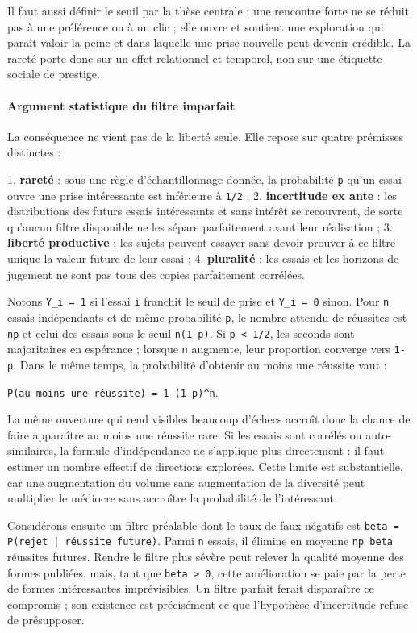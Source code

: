 \documentclass[10pt,a4paper]{article}
\begin{document}
Il faut aussi définir le seuil par la thèse centrale : une rencontre forte ne se réduit pas à une préférence ou à un clic ; elle ouvre et soutient une exploration qui paraît valoir la peine et dans laquelle une prise nouvelle peut devenir crédible. La rareté porte donc sur un effet relationnel et temporel, non sur une étiquette sociale de prestige.

\paragraph{Argument statistique du filtre imparfait}
La conséquence ne vient pas de la liberté seule. Elle repose sur quatre prémisses distinctes :

1. \textbf{rareté} : sous une règle d'échantillonnage donnée, la probabilité \texttt{p} qu'un essai    ouvre une prise intéressante est inférieure à \texttt{1/2} ; 2. \textbf{incertitude ex ante} : les distributions des futurs essais intéressants et sans    intérêt se recouvrent, de sorte qu'aucun filtre disponible ne les sépare parfaitement    avant leur réalisation ; 3. \textbf{liberté productive} : les sujets peuvent essayer sans devoir prouver à ce filtre    unique la valeur future de leur essai ; 4. \textbf{pluralité} : les essais et les horizons de jugement ne sont pas tous des copies    parfaitement corrélées.

Notons \texttt{Y\_i = 1} si l'essai \texttt{i} franchit le seuil de prise et \texttt{Y\_i = 0} sinon. Pour \texttt{n} essais indépendants et de même probabilité \texttt{p}, le nombre attendu de réussites est \texttt{np} et celui des essais sous le seuil \texttt{n(1-p)}. Si \texttt{p < 1/2}, les seconds sont majoritaires en espérance ; lorsque \texttt{n} augmente, leur proportion converge vers \texttt{1-p}. Dans le même temps, la probabilité d'obtenir au moins une réussite vaut :

\texttt{P(au moins une réussite) = 1-(1-p)\textasciicircum{}n}.

La même ouverture qui rend visibles beaucoup d'échecs accroît donc la chance de faire apparaître au moins une réussite rare. Si les essais sont corrélés ou auto-similaires, la formule d'indépendance ne s'applique plus directement : il faut estimer un nombre effectif de directions explorées. Cette limite est substantielle, car une augmentation du volume sans augmentation de la diversité peut multiplier le médiocre sans accroître la probabilité de l'intéressant.

Considérons ensuite un filtre préalable dont le taux de faux négatifs est \texttt{beta = P(rejet | réussite future)}. Parmi \texttt{n} essais, il élimine en moyenne \texttt{np beta} réussites futures. Rendre le filtre plus sévère peut relever la qualité moyenne des formes publiées, mais, tant que \texttt{beta > 0}, cette amélioration se paie par la perte de formes intéressantes imprévisibles. Un filtre parfait ferait disparaître ce compromis ; son existence est précisément ce que l'hypothèse d'incertitude refuse de présupposer.
\end{document}
